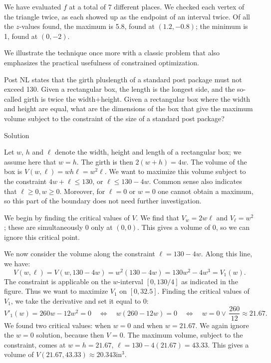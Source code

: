 \begin{example}
We have evaluated $f$ at a total of 7 different places. We checked each vertex of the triangle twice, as each showed up as the endpoint of an interval twice. Of all the $z$-values found, the maximum is 5.8, found at $(1.2,-0.8)$; the minimum is 1, found at $(0,-2)$. 
\end{example}


We illustrate the technique once more with a classic problem that also emphasizes the practical usefulness of constrained optimization.  

\begin{example}
 Post NL states that the girth pluslength of a standard post package must not exceed 130. Given a rectangular box, the length is the longest side, and the so-called girth is twice the width+height. Given a rectangular box where the width and height are equal, what are the dimensions of the box that give the maximum volume subject to the constraint of the size of a standard post package?

Solution 


Let $w$, $h$ and $\ell$ denote the width, height and length of a rectangular box; we assume here that $w=h$. The girth is then $2(w+h) = 4w$. The volume of the box is $V(w,\ell) = wh\ell = w^2\ell$. We want to maximize this volume subject to the constraint $4w+\ell\leq 130$, or $\ell\leq 130-4w$. Common sense also indicates that $\ell \geq 0, w \geq 0$. Moreover, for $\ell = 0$ or $w  = 0$ one cannot obtain a maximum, so this part of the boundary does not need further investigation. 

We begin by finding the critical values of $V$. We find that $V_w = 2w\ell$ and $V_\ell = w^2$; these are simultaneously 0 only at $(0,0)$. This gives a volume of 0, so we can ignore this critical point. 

We now consider the volume along the constraint $\ell=130-4w.$ Along this line, we have:
$$V(w,\ell) = V(w,130-4w) = w^2(130-4w) = 130w^2-4w^3 = V_1(w).$$
The constraint is applicable on the $w$-interval $[0,130/4]$ as indicated in the figure. Thus we want to maximize $V_1$ on $[0,32.5]$. Finding the critical values of $V_1$, we take the derivative and set it equal to 0:
$$V'_1(w) = 260w-12w^2 = 0 \quad \Leftrightarrow \quad w(260-12w)= 0 \quad \Leftrightarrow \quad w=0 \vee\,\frac{260}{12}\approx 21.67.$$
We found two critical values: when $w=0$ and when $w=21.67$. We again ignore the $w=0$ solution, because then $V=0$. The maximum volume, subject to the constraint, comes at $w=h=21.67$, $\ell = 130-4(21.67) =43.33.$ This gives a volume of $V(21.67,43.33) \approx 20.343$in$^3$. 


\end{example}

